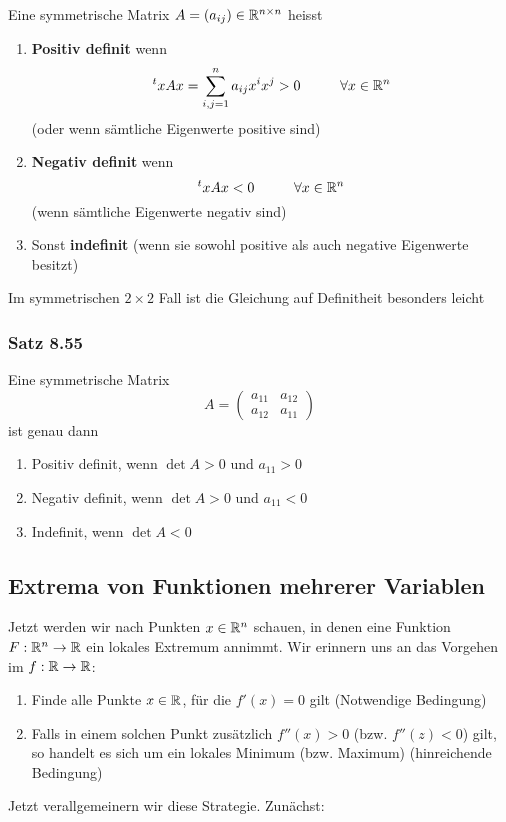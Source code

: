 \begin{definition}{8.54}
Eine symmetrische Matrix $A=\left( a_{ij}\right)\in\mathbb{R}^{n\times n}$ heisst
\begin{enumerate}
\item \textbf{Positiv definit} wenn \[{}^txAx = \sum\limits_{i,j = 1}^n {{a_{ij}}{x^i}{x^j} > 0}\hspace{10mm}\forall x\in\R^n\] (oder wenn sämtliche Eigenwerte positive sind)
\item \textbf{Negativ definit} wenn \[{}^txAx < 0\hspace{10mm}\forall x\in\R^n\] (wenn sämtliche Eigenwerte negativ sind)
\item Sonst \textbf{indefinit} (wenn sie sowohl positive als auch negative Eigenwerte besitzt)
\end{enumerate}
Im symmetrischen $2\times 2$ Fall ist die Gleichung auf Definitheit besonders leicht
\end{definition}

\subsubsection*{Satz 8.55}
Eine symmetrische Matrix
\[A = \left( {\begin{array}{*{20}{c}}
{{a_{11}}}&{{a_{12}}}\\
{{a_{12}}}&{{a_{11}}}
\end{array}} \right)\]
ist genau dann
\begin{enumerate}
\item Positiv definit, wenn $\det A>0$ und $a_{11}>0$
\item Negativ definit, wenn $\det A>0$ und $a_{11}<0$
\item Indefinit, wenn $\det A<0$
\end{enumerate}

\subsection*{Extrema von Funktionen mehrerer Variablen}
Jetzt werden wir nach Punkten $x\in\mathbb{R}^n$ schauen, in denen eine Funktion $F:\mathbb{R}^n\to\mathbb{R}$ ein lokales Extremum annimmt. Wir erinnern uns an das Vorgehen im $f:\mathbb{R}\to\mathbb{R}$:
\begin{enumerate}
\item Finde alle Punkte $x\in\mathbb{R}$, für die $f'(x)=0$ gilt (Notwendige Bedingung)
\item Falls in einem solchen Punkt zusätzlich $f''(x)>0$ (bzw. $f''(z)<0$) gilt, so handelt es sich um ein lokales Minimum (bzw. Maximum) (hinreichende Bedingung)
\end{enumerate}
Jetzt verallgemeinern wir diese Strategie. Zunächst:

